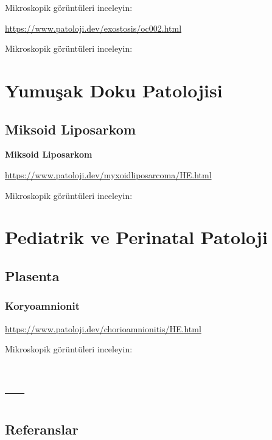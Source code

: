 \documentclass[
  letterpaper,
  DIV=11,
  numbers=noendperiod]{scrreprt}
\begin{document}
Mikroskopik görüntüleri inceleyin:

\url{https://www.patoloji.dev/exostosis/oc002.html}

Mikroskopik görüntüleri inceleyin:

\hypertarget{section-1}{%
\subsection{}\label{section-1}}

\part{Yumuşak Doku Patolojisi}

\hypertarget{miksoid-liposarkom}{%
\chapter{Miksoid Liposarkom}\label{miksoid-liposarkom}}

\textbf{Miksoid Liposarkom}

\url{https://www.patoloji.dev/myxoidliposarcoma/HE.html}

Mikroskopik görüntüleri inceleyin:

\part{Pediatrik ve Perinatal Patoloji}

\hypertarget{plasenta}{%
\chapter{Plasenta}\label{plasenta}}

\hypertarget{koryoamnionit}{%
\section{Koryoamnionit}\label{koryoamnionit}}

\url{https://www.patoloji.dev/chorioamnionitis/HE.html}

Mikroskopik görüntüleri inceleyin:

\part{---}


\hypertarget{referanslar}{%
\chapter*{Referanslar}\label{referanslar}}
\end{document}
